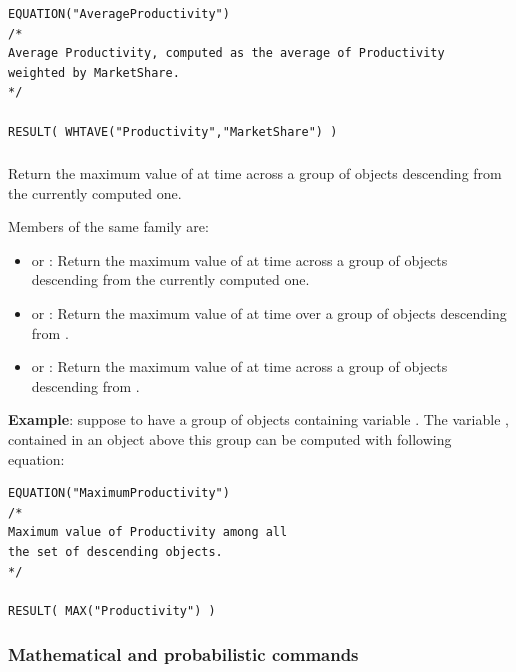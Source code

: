 \documentclass [11pt,a4paper] {book}
\begin{document}
 \small
\begin{verbatim}
EQUATION("AverageProductivity")
/*
Average Productivity, computed as the average of Productivity
weighted by MarketShare.
*/

RESULT( WHTAVE("Productivity","MarketShare") )
\end{verbatim}
\normalsize

\subsubsection{ }
Return the maximum value of  at time  across a group of objects descending from the currently computed one.

Members of the same family are:

\begin{itemize}
  \item {} or : Return the maximum value of  at time  across a group of objects descending from the currently computed one.
  \item {} or : Return the maximum value of  at time  over a group of objects descending from  .
  \item {} or : Return the maximum value of  at time  across a group of objects descending from  .

\end{itemize}

\textbf{Example}: suppose to have a group of objects  containing variable
. The variable , contained in an object above this group can
be computed with following equation:



 \small
\begin{verbatim}
EQUATION("MaximumProductivity")
/*
Maximum value of Productivity among all 
the set of descending objects.
*/

RESULT( MAX("Productivity") )
\end{verbatim}
\normalsize




\subsubsection{Mathematical and probabilistic commands} \label{sec:math_prob}
\end{document}
